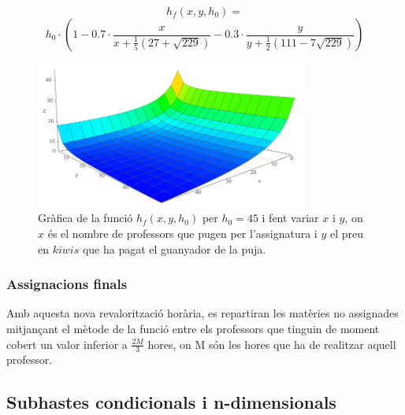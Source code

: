 \documentclass[10pt,twocolumn]{article}
\begin{document}
	$$h_f(x,y,h_0)=$$ $$h_0\cdot (1-0.7\cdot \frac{x}{x+\frac{1}{5}(27+\sqrt{229})}-0.3\cdot\frac{y}{y+\frac{1}{2}(111-7\sqrt{229})} )$$
	\begin{figure}[ht]
		\centering
		\includegraphics[width=9cm]{kiww}
		\caption{Gràfica de la funció $h_f(x,y,h_0)$ per $h_0=45$ i fent variar $x$ i $y$, on $x$ és el nombre de professors que pugen per l'assignatura i $y$ el preu en $kiwis$ que ha pagat el guanyador de la puja.}
		\label{fig:444}
	\end{figure}

\subsubsection{Assignacions finals}

Amb aquesta nova revalorització horària, es repartiran les matèries no assignades mitjançant el mètode de la funció entre els professors que tinguin de moment cobert un valor inferior a $\frac{2M}{3}$ hores, on M són les hores que ha de realitzar aquell professor.
\subsection{Subhastes condicionals i n-dimensionals}
\end{document}

